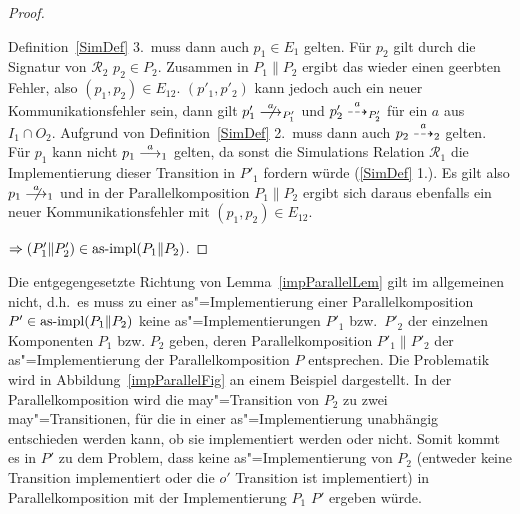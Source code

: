 \begin{proof}
\begin{enumerate}
      Definition~\ref{SimDef} 3.\ muss dann auch $p_1\in E_1$ gelten. Für $p_2$
      gilt durch die Signatur von $\mathcal{R}_2$ $p_2\in P_2$. Zusammen in
      $P_1\|P_2$ ergibt das wieder  einen geerbten Fehler, also $(p_1,p_2)\in
      E_{12}$. $(p'_1,p'_2)$ kann jedoch auch ein neuer Kommunikationsfehler
      sein, dann gilt \oBdA{} $p'_1\nmust[a]_{P'_1}$ und $p'_2\may[a]_{P'_2}$
      für ein $a$ aus $I_1\cap O_2$. Aufgrund von Definition~\ref{SimDef} 2.\
      muss dann auch $p_2\may[a]_2$ gelten. Für $p_1$ kann nicht
      $p_1\must[a]_1$ gelten, da sonst die Simulations Relation $\mathcal{R}_1$
      die Implementierung dieser Transition in $P'_1$ fordern würde
      (\ref{SimDef} 1.). Es gilt also $p_1\nmust[a]_1$ und in der
      Parallelkomposition $P_1\|P_2$ ergibt sich daraus ebenfalls ein neuer
      Kommunikationsfehler mit $(p_1,p_2)\in E_{12}$.
  \end{enumerate}
  $\Rightarrow (P'_1\|P'_2)\in\mathrm{as}\text{-}\mathrm{impl} (P_1\|P_2)$.
\end{proof}

Die entgegengesetzte Richtung von Lemma~\ref{impParallelLem} gilt im
allgemeinen nicht, d.h.\ es muss zu einer as"=Implementierung einer
Parallelkomposition $P'\in\mathrm{as}\text{-}\mathrm{impl} (P_1\|P_2)$ keine as"=Implementierungen $P'_1$
bzw.\ $P'_2$ der einzelnen Komponenten $P_1$ bzw. $P_2$ geben, deren
Parallelkomposition $P'_1\|P'_2$ der as"=Implementierung der
Parallelkomposition $P$ entsprechen. Die Problematik wird
in Abbildung~\ref{impParallelFig} an einem Beispiel dargestellt. In der
Parallelkomposition wird die may"=Transition von $P_2$ zu zwei
may"=Transitionen, für die in einer as"=Implementierung unabhängig
entschieden werden kann, ob sie implementiert werden oder nicht. Somit kommt es
in $P'$ zu dem Problem, dass keine as"=Implementierung von $P_2$ (entweder
keine Transition implementiert oder die $o'$ Transition ist implementiert) in
Parallelkomposition mit der Implementierung $P_1$ $P'$ ergeben würde.


